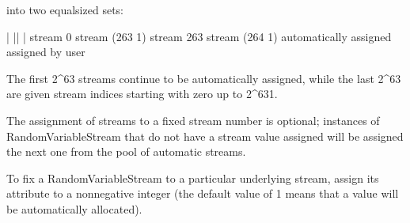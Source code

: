 \documentclass[letterpaper,10pt,english]{sphinxmanual}
\renewcommand{\sphinxcode}[1]{\texttt{\small{#1}}}
\begin{document}
into two equal\sphinxhyphen{}sized sets:

\begin{sphinxVerbatim}[commandchars=\\\{\}]
\PYGZlt{}\PYGZhy{}\PYGZhy{}\PYGZhy{}\PYGZhy{}\PYGZhy{}\PYGZhy{}\PYGZhy{}\PYGZhy{}\PYGZhy{}\PYGZhy{}\PYGZhy{}\PYGZhy{}\PYGZhy{}\PYGZhy{}\PYGZhy{}\PYGZhy{}\PYGZhy{}\PYGZhy{}\PYGZhy{}\PYGZhy{}\PYGZhy{}\PYGZhy{}\PYGZhy{}\PYGZhy{}\PYGZhy{}\PYGZhy{}\PYGZhy{}\PYGZhy{}\PYGZhy{}\PYGZhy{}\PYGZhy{}\PYGZhy{}\PYGZhy{}\PYGZhy{}\PYGZhy{}\PYGZhy{}\PYGZhy{}\PYGZhy{}\PYGZhy{}\PYGZhy{}\PYGZhy{}\PYGZhy{}\PYGZhy{}\PYGZhy{}\PYGZhy{}\PYGZhy{}\PYGZhy{}\PYGZhy{}\PYGZhy{}\PYGZhy{}\PYGZhy{}\PYGZhy{}\PYGZhy{}\PYGZhy{}\PYGZhy{}\PYGZhy{}\PYGZhy{}\PYGZhy{}\PYGZhy{}\PYGZhy{}\PYGZhy{}\PYGZhy{}\PYGZhy{}\PYGZhy{}\PYGZhy{}\PYGZhy{}\PYGZhy{}\PYGZhy{}\PYGZhy{}\PYGZhy{}\PYGZhy{}\PYGZhy{}\PYGZhy{}\PYGZhy{}\PYGZgt{}
\PYGZca{}                                    \PYGZca{}\PYGZca{}                                    \PYGZca{}
|                                    ||                                    |
stream 0            stream (2\PYGZca{}63 \PYGZhy{} 1)  stream 2\PYGZca{}63         stream (2\PYGZca{}64 \PYGZhy{} 1)
\PYGZlt{}\PYGZhy{} automatically assigned \PYGZhy{}\PYGZhy{}\PYGZhy{}\PYGZhy{}\PYGZhy{}\PYGZhy{}\PYGZhy{}\PYGZhy{}\PYGZhy{}\PYGZhy{}\PYGZhy{}\PYGZgt{}\PYGZlt{}\PYGZhy{} assigned by user \PYGZhy{}\PYGZhy{}\PYGZhy{}\PYGZhy{}\PYGZhy{}\PYGZhy{}\PYGZhy{}\PYGZhy{}\PYGZhy{}\PYGZhy{}\PYGZhy{}\PYGZhy{}\PYGZhy{}\PYGZhy{}\PYGZhy{}\PYGZhy{}\PYGZhy{}\PYGZgt{}
\end{sphinxVerbatim}

The first 2\textasciicircum{}63 streams continue to be automatically assigned, while
the last 2\textasciicircum{}63 are given stream indices starting with zero up to
2\textasciicircum{}63\sphinxhyphen{}1.

The assignment of streams to a fixed stream number is optional; instances
of RandomVariableStream that do not have a stream value assigned will
be assigned the next one from the pool of automatic streams.

To fix a RandomVariableStream to a particular underlying stream, assign
its \sphinxcode{} attribute to a non\sphinxhyphen{}negative integer (the default value
of \sphinxhyphen{}1 means that a value will be automatically allocated).
\end{document}
